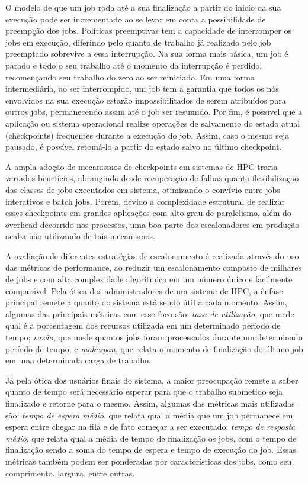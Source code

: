 O modelo de que um job roda até a sua finalização a partir do início da sua execução pode ser incrementado
ao se levar em conta a possibilidade de preempção dos jobs. Políticas preemptivas tem a capacidade de
interromper os jobs em execução, diferindo pelo quanto de trabalho já realizado pelo job preemptado
sobrevive a essa interrupção. Na sua forma mais básica, um job é parado e todo o seu trabalho até o momento
da interrupção é perdido, recomençando seu trabalho do zero ao ser reiniciado. Em uma forma intermediária,
ao ser interrompido, um job tem a garantia que todos os nós envolvidos na sua execução estarão impossibilitados
de serem atribuídos para outros jobs, permanecendo assim até o job ser resumido. Por fim, é possível que 
a aplicação ou sistema operacional realize operações de salvamento do estado atual (checkpoints) frequentes
durante a execução do job. Assim, caso o mesmo seja pausado, é possível retomá-lo a partir do estado salvo
no último checkpoint. 

A ampla adoção de mecanismos de checkpoints em sistemas de HPC traria variados benefícios,
abrangindo desde recuperação de falhas quanto flexibilização das classes de jobs executados em sistema,
otimizando o convívio entre jobs interativos e batch jobs. Porém, devido a complexidade estrutural de
realizar esses checkpoints em grandes aplicações com alto grau de paralelismo, além do overhead decorrido
nos processos, uma boa parte dos escalonadores em produção acaba não utilizando de tais mecanismos.

A avaliação de diferentes estratégias de escalonamento é realizada através do uso das métricas de performance,
ao reduzir um escalonamento composto de milhares de jobs e com alta complexidade algorítmica em um 
número único e facilmente comparável. Pela ótica dos administradores de um sistema de HPC, a ênfase principal
remete a quanto do sistema está sendo útil a cada momento. Assim, algumas das principais métricas 
com esse foco são: \textit{taxa de utilização}, que mede qual é a porcentagem dos recursos utilizada em um 
determinado período de tempo; \textit{vazão}, que mede quantos jobs foram processados durante um determinado 
período de tempo; e \textit{makespan}, que relata o momento de finalização do último job em uma determinada 
carga de trabalho. 

Já pela ótica dos usuários finais do sistema, a maior preocupação remete a saber quanto de tempo será
necessário esperar para que o trabalho submetido seja finalizado e retorne para o mesmo. Assim, algumas 
das métricas mais utilizadas são: \textit{tempo de espera médio}, que relata qual a média que um job 
permanece em espera entre chegar na fila e de fato começar a ser executado; \textit{tempo de resposta médio}, 
que relata qual a média de tempo de finalização os jobs, com o tempo de finalização sendo a soma do tempo
de espera e tempo de execução do job. Essas métricas também podem ser ponderadas por características dos jobs,
como seu comprimento, largura, entre outras.

